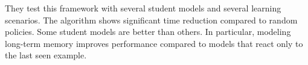 They test this framework with several student models and several learning scenarios. The algorithm shows significant time reduction compared to random policies. Some student models are better than others. In particular, modeling long-term memory improves performance compared to models that react only to the last seen example.